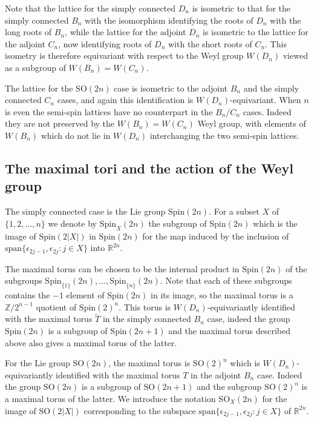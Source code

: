 \documentclass[11pt,a4paper]{article}
\def\Spin{\mathrm{Spin}}
\def\SO{\mathrm{SO}}
\def\R{\mathbb{R}}
\def\Z{\mathbb{Z}}
\def\coveringtorus{\tilde{T}}
\begin{document}
Note that the lattice for the simply connected $D_n$ is isometric to that for the simply connected $B_n$ with the isomorphism identifying the roots of $D_n$ with the long roots of $B_n$, while the lattice for the adjoint $D_n$ is isometric to the lattice for the adjoint $C_n$, now identifying roots of $D_n$ with the short roots of $C_n$. This isometry is therefore equivariant with respect to the Weyl group $W(D_n)$ viewed as a subgroup of $W(B_n)=W(C_n)$.

The lattice for the $\SO(2n)$ case is isometric to the adjoint $B_n$ and the simply connected $C_n$ cases, and again this identification is $W(D_n)$-equivariant. When $n$ is even the semi-spin lattices have no counterpart in the $B_n$/$C_n$ cases. Indeed they are not preserved by the $W(B_n)=W(C_n)$ Weyl group, with elements of $W(B_n)$ which do not lie in $W(D_n)$ interchanging the two semi-spin lattices.


\subsection{The maximal tori and the action of the Weyl group}
The simply connected case is the Lie group $\Spin(2n)$.  For a subset $X$ of $\{1,2,\dots,n\}$ we denote by $\Spin_X(2n)$ the subgroup of $\Spin(2n)$ which is the image of $\Spin(2|X|)$ in $\Spin(2n)$ for the map induced by the inclusion of $\mathrm{span}\{\epsilon_{2j-1},\epsilon_{2j} : j \in X\}$ into $\R^{2n}$.

The maximal torus can be chosen to be the internal product in $\Spin(2n)$ of the subgroups $\Spin_{\{1\}}(2n),\dots,\Spin_{\{n\}}(2n)$. Note that each of these subgroups contains the $-1$ element of $\Spin(2n)$ in its image, so the maximal torus is a $\Z/2^{n-1}$ quotient of $\Spin(2)^n$. This torus is $W(D_n)$-equivariantly identified with the maximal torus $\coveringtorus$ in the simply connected $B_n$ case, indeed the group $\Spin(2n)$ is a subgroup of $\Spin(2n+1)$ and the maximal torus described above also gives a maximal torus of the latter.



For the Lie group $\SO(2n)$, the maximal torus is $\SO(2)^n$ which is
$W(D_n)$-equi\-variantly identified with the maximal torus $T$ in the adjoint $B_n$ case. Indeed the group $\SO(2n)$ is a subgroup of $\SO(2n+1)$ and the subgroup $\SO(2)^n$ is a maximal torus of the latter. We introduce the notation $\SO_X(2n)$ for the image of $\SO(2|X|)$ corresponding to the subspace $\mathrm{span}\{\epsilon_{2j-1},\epsilon_{2j} : j \in X\}$ of $\R^{2n}$.
\end{document}
